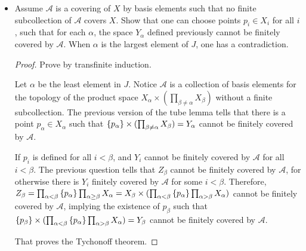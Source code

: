 \documentclass[12pt,a4paper]{article}
\begin{document}
\begin{ex}
\begin{itemize}
\begin{proof}
                Otherwise, let $J_A=\set{i<\beta:\pi_i(A)\neq X_i}$. We know $J_A$ is finite due to the product topology, then $\cup_{A\in\mathcal{A}}J_A$ is finite with largest element $\alpha$. For all $x\in Y_\alpha$, there is $y\in Z_\beta$ such that $\pi_i(x)=\pi_i(y)$ for all $i\leq\alpha$ and $i\geq\beta$, we know $y\in A$ for some $A\in\mathcal{A}$, then one can prove that $x\in A$ as well. It follows that $Y_\alpha$ is covered by $\mathcal{A}$.
            \end{proof}
            \begin{remark}
                In fact, it is not necessary to split the case when $\beta$ has an immediate predecessor.
            \end{remark}

            \item Assume $\mathcal{A}$ is a covering of $X$ by basis elements such that no finite subcollection of $\mathcal{A}$ covers $X$. Show that one can choose points $p_i\in X_i$ for all $i$, such that for each $\alpha$, the space $Y_\alpha$ defined previously cannot be finitely covered by $\mathcal{A}$. When $\alpha$ is the largest element of $J$, one has a contradiction.
            \begin{proof}
                Prove by transfinite induction. 
                
                Let $\alpha$ be the least element in $J$. Notice $\mathcal{A}$ is a collection of basis elements for the topology of the product space $X_\alpha\times(\prod_{\beta\neq\alpha}X_\beta)$ without a finite subcollection. The previous version of the tube lemma tells that there is a point $p_\alpha\in X_\alpha$ such that $\left\{p_\alpha\right\}\times(\prod_{\beta\neq\alpha}X_\beta)=Y_\alpha$ cannot be finitely covered by $\mathcal{A}$. 

                If $p_i$ is defined for all $i<\beta$, and $Y_i$ cannot be finitely covered by $\mathcal{A}$ for all $i<\beta$. The previous question tells that $Z_\beta$ cannot be finitely covered by $\mathcal{A}$, for otherwise there is $Y_i$ finitely covered by $\mathcal{A}$ for some $i<\beta$. Therefore, $Z_\beta=\prod_{\alpha<\beta}\left\{p_\alpha\right\}\prod_{\alpha\geq\beta}X_\alpha=X_\beta\times(\prod_{\alpha<\beta}\left\{p_\alpha\right\}\prod_{\alpha>\beta}X_\alpha)$ cannot be finitely covered by $\mathcal{A}$, implying the existence of $p_\beta$ such that $\left\{p_\beta\right\}\times(\prod_{\alpha<\beta}\left\{p_\alpha\right\}\prod_{\alpha>\beta}X_\alpha)=Y_\beta$ cannot be finitely covered by $\mathcal{A}$. 

                That proves the Tychonoff theorem.
            \end{proof}
        \end{itemize}
    \end{ex}
    
\end{document}
